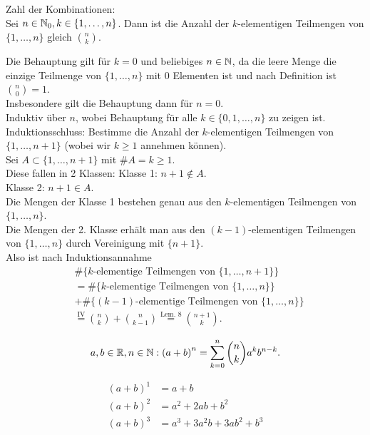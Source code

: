\documentclass[../ana1.tex]{subfiles}
\begin{document}
\begin{satz}
	Zahl der Kombinationen:\\
	Sei \( n\in\mathbb{N}_0, k\in \{1,\ldots,n\} \). Dann ist die Anzahl der \(k\)-elementigen Teilmengen von \( \{1,\ldots,n\} \) gleich \( \binom{n}{k} \).
\end{satz}
\begin{bew}
	Die Behauptung gilt für \(k=0\) und beliebiges \(n\in\mathbb{N} \), da die leere Menge die einzige Teilmenge von \( \{1,\ldots,n\} \) mit 0 Elementen ist und nach Definition ist \( \binom{n}{0} = 1 \).\\
	Insbesondere gilt die Behauptung dann für \(n=0\).\\
	Induktiv über \(n\), wobei Behauptung für alle \(k\in \{0,1,\ldots,n\} \) zu zeigen ist.\\
	Induktionsschluss: Bestimme die Anzahl der \(k\)-elementigen Teilmengen von \( \{ 1,\ldots,n+1 \} \) (wobei wir \(k\geq 1\) annehmen können).\\
	Sei \(A\subset \{1,\ldots,n+1\} \) mit \( \#A = k\geq 1\). \\
	Diese fallen in 2 Klassen:
	Klasse 1: \(n+1 \notin A\).\\
	Klasse 2: \(n+1 \in A\).\\
	Die Mengen der Klasse 1 bestehen genau aus den \(k\)-elementigen Teilmengen von \( \{1,\ldots,n\} \).\\
	Die Mengen der 2. Klasse erhält man aus den \((k-1)\)-elementigen Teilmengen von \( \{1,\ldots,n\} \) durch Vereinigung mit \( \{n+1\} \).\\
	Also ist nach Induktionsannahme
	\begin{align*}
		 &  \# \{k\text{-elementige Teilmengen von } \{1,\ldots,n+1\} \}                                     \\
		 &= \# \{k\text{-elementige Teilmengen von } \{1,\ldots,n\} \}                                      \\
		 &+ \# \{(k-1)\text{-elementige Teilmengen von } \{1,\ldots,n\} \} \\
		 &  \overset{\text{IV}}{=} \binom{n}{k} + \binom{n}{k-1} \overset{\text{Lem. 8}}{=} \binom{n+1}{k}.
	\end{align*}
\end{bew}
\begin{satz}
	\[ a,b\in\mathbb{R},n\in\mathbb{N}:{(a+b)}^n = \sum_{k=0}^{n} \binom{n}{k} a^k b^{n-k}. \]
\end{satz}
\begin{bem}
	\begin{align}
		{(a+b)}^1 & = a+b                     \\
		{(a+b)}^2 & = a^2 + 2ab + b^2         \\
		{(a+b)}^3 & = a^3 +3a^2b + 3ab^2 +b^3
	\end{align}
\end{bem}
\end{document}
